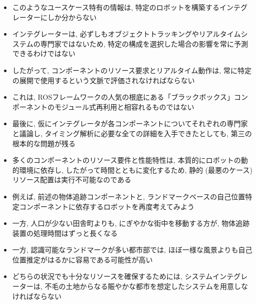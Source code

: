 \begin{frame}{}
    \begin{itemize}
        \item このようなユースケース特有の情報は, 特定のロボットを構築するインテグレーターにしか分からない
        \item インテグレーターは, 必ずしもオブジェクトトラッキングやリアルタイムシステムの専門家ではないため, 特定の構成を選択した場合の影響を常に予測できるわけではない
        \item したがって, コンポーネントのリソース要求とリアルタイム動作は, 常に特定の展開で使用するという文脈で評価されなければならない
        \item これは, ROSフレームワークの人気の根底にある「ブラックボックス」コンポーネントのモジュール式再利用と相容れるものではない
    \end{itemize}
\end{frame}

\begin{frame}{}
    \begin{itemize}
        \item 最後に, 仮にインテグレータが各コンポーネントについてそれぞれの専門家と議論し, タイミング解析に必要な全ての詳細を入手できたとしても, 第三の根本的な問題が残る
        \item 多くのコンポーネントのリソース要件と性能特性は, 本質的にロボットの動的環境に依存し, したがって時間とともに変化するため, 静的 (最悪のケース) リソース配置は実行不可能なのである
    \end{itemize}
\end{frame}

\begin{frame}{}
    \begin{itemize}
        \item 例えば, 前述の物体追跡コンポーネントと, ランドマークベースの自己位置特定コンポーネントに依存するロボットを再度考えてみよう
        \item 一方, 人口が少ない田舎町よりも, にぎやかな街中を移動する方が, 物体追跡装置の処理時間はずっと長くなる
        \item 一方, 認識可能なランドマークが多い都市部では, ほぼ一様な風景よりも自己位置推定がはるかに容易である可能性が高い
        \item どちらの状況でも十分なリソースを確保するためには, システムインテグレーターは, 不毛の土地からなる賑やかな都市を想定したシステムを用意しなければならない
    \end{itemize}
\end{frame}

